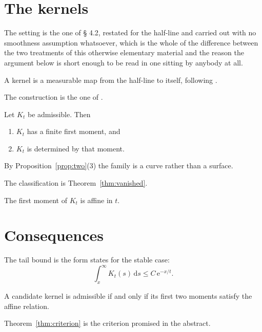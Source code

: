 \section{The kernels}
\label{sec:kernels}

The setting is the one of § 4.2, restated for the half-line and carried out with no
smoothness assumption whatsoever, which is the whole of the difference between the two
treatments of this otherwise elementary material and the reason the argument below is
short enough to be read in one sitting by anybody at all.

A kernel is a measurable map from the half-line to itself, following
\cite{author2020kernels}.

The construction is the one of \cite{nobody2020}.

\begin{proposition}
  \label{prop:two}
  Let $K_t$ be admissible. Then
  \begin{enumerate}
    \item $K_t$ has a finite first moment, and
    \item $K_t$ is determined by that moment.
  \end{enumerate}
\end{proposition}

By Proposition~\ref{prop:two}(3) the family is a curve rather than a surface.

The classification is Theorem~\ref{thm:vanished}.

\begin{lemma}
  \label{lem:moment}
  The first moment of $K_t$ is affine in $t$.
\end{lemma}

\section{Consequences}
\label{sec:consequences}

The tail bound is the form \cite{writer2019tails} states for the stable case:
\begin{equation}
  \int_x^\infty K_t(s)\,\mathrm{d}s \le C\,\mathrm{e}^{-x/t}.
  \tag{1.4}
\end{equation}

\begin{theorem}
  \label{thm:criterion}
  A candidate kernel is admissible if and only if its first two moments satisfy the
  affine relation.
\end{theorem}

Theorem~\ref{thm:criterion} is the criterion promised in the abstract.

